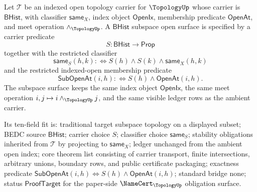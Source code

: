 \begin{definition}
\label{def:topology-bhist-subspace-open-surface}
Let $\mathcal{T}$ be an indexed open topology carrier for $\TopologyUp$ whose carrier is $\mathsf{BHist}$, with classifier $\mathsf{same}_X$, index object $\mathsf{OpenIx}$, membership predicate $\mathsf{OpenAt}$, and meet operation $\wedge_{\TopologyUp}$. A $\mathsf{BHist}$ subspace open surface is specified by a carrier predicate
$$
S:\mathsf{BHist}\to\mathsf{Prop}
$$
together with the restricted classifier
$$
\mathsf{same}_S(h,k):\Longleftrightarrow S(h)\wedge S(k)\wedge \mathsf{same}_X(h,k)
$$
and the restricted indexed-open membership predicate
$$
\mathsf{SubOpenAt}(i,h):\Longleftrightarrow S(h)\wedge \mathsf{OpenAt}(i,h).
$$
The subspace surface keeps the same index object $\mathsf{OpenIx}$, the same meet operation $i,j\mapsto i\wedge_{\TopologyUp}j$, and the same visible ledger rows as the ambient carrier.

Its ten-field fit is: traditional target subspace topology on a displayed subset; BEDC source $\mathsf{BHist}$; carrier choice $S$; classifier choice $\mathsf{same}_S$; stability obligations inherited from $\mathcal{T}$ by projecting to $\mathsf{same}_X$; ledger unchanged from the ambient open index; core theorem list consisting of carrier transport, finite intersections, arbitrary unions, boundary rows, and public certificate packaging; exactness predicate $\mathsf{SubOpenAt}(i,h)\Longleftrightarrow S(h)\wedge\mathsf{OpenAt}(i,h)$; standard bridge none; status $\mathsf{ProofTarget}$ for the paper-side $\NameCert_{\TopologyUp}$ obligation surface.
\end{definition}

